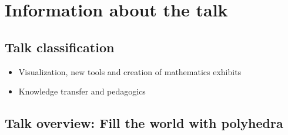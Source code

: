 \documentclass[a4paper,10pt]{article}
\begin{document}
     

\section{Information about the talk}

\subsection{Talk classification}

\begin{itemize}
\item Visualization, new tools and creation of mathematics exhibits
\item Knowledge transfer and pedagogics 
\end{itemize}

\subsection{Talk overview: Fill the world with polyhedra}

\end{document}
